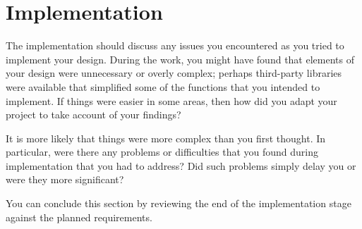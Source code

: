 \chapter{Implementation}

The implementation should discuss any issues you encountered as you tried to implement your design. During the work, you might have found that elements of your design were unnecessary or overly complex; perhaps third-party libraries were available that simplified some of the functions that you intended to implement. If things were easier in some areas, then how did you adapt your project to take account of your findings?

It is more likely that things were more complex than you first thought. In particular, were there any problems or difficulties that you found during implementation that you had to address? Did such problems simply delay you or were they more significant?

You can conclude this section by reviewing the end of the implementation stage against the planned requirements. 
